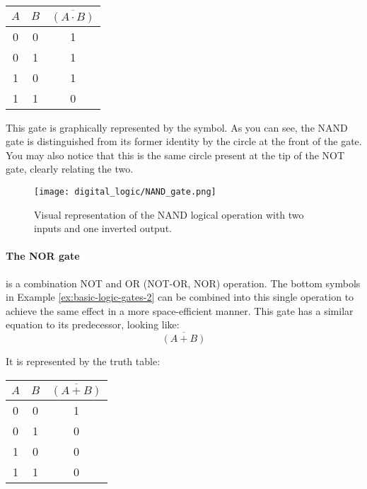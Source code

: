     \begin{table}[h!]
        \begin{tabular}{c c | c}
            \toprule
            $A$ & $B$ & $\overline{(A \cdot B)}$  \\
            \midrule
             0  &  0  &    1    \\
             0  &  1  &    1    \\
             1  &  0  &    1    \\
             1  &  1  &    0    \\
            \bottomrule
        \end{tabular}
    \end{table}

    This gate is graphically represented by the symbol. 
    As you can see, the NAND gate is distinguished from its former identity by the circle at the front of the gate.
    You may also notice that this is the same circle present at the tip of the NOT gate, clearly relating the two.
    \begin{figure}[h!]
        \texttt{[image: digital\_logic/NAND\_gate.png]}
        \caption[NAND Gate]{Visual representation of the NAND logical operation with two inputs and one inverted output.}
    \end{figure}

    \paragraph*{The NOR gate} is a combination NOT and OR (NOT-OR, NOR) operation.
    The bottom symbols in Example \ref{ex:basic-logic-gates-2} can be combined into this single operation to achieve the same effect in a more space-efficient manner.
    This gate has a similar equation to its predecessor, looking like:
    \begin{equation*}
        \overline{(A + B)}
    \end{equation*}

    It is represented by the truth table:
    \begin{table}[h!]
        \begin{tabular}{c c | c}
            \toprule
            $A$ & $B$ & $\overline{(A + B)}$  \\
            \midrule
             0  &  0  &    1    \\
             0  &  1  &    0    \\
             1  &  0  &    0    \\
             1  &  1  &    0    \\
            \bottomrule
        \end{tabular}
    \end{table}

